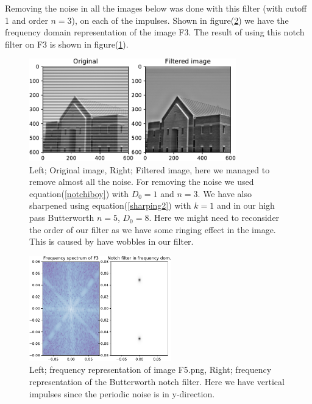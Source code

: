 {Removing the noise in all the images below was done with this filter (with cutoff 1 and order $n = 3$), on each of the impulses. Shown in figure(\ref{C7F3freq}) we have the frequency domain representation of the image F3. The result of using this notch filter on F3 is shown in figure(\ref{C7F3}).

\begin{figure}[!htb]
    {\centering
        \includegraphics[width=0.80\textwidth]{C7F3.pdf}
        \caption{Left; Original image, Right; Filtered image, here we managed to remove almost all the noise. For removing the noise we used equation(\ref{notchiboy}) with $D_{0} = 1$ and $n = 3$.  We have also sharpened using equation(\ref{sharping2}) with $k = 1$ and in our high pass Butterworth $n = 5$, $D_{0} = 8$. Here we might need to reconsider the order of our filter as we have some ringing effect in the image. This is caused by have wobbles in our filter.}
        \label{C7F3}
    \par}
    \end{figure}



    \begin{figure}[!htb]
        {\centering
            \includegraphics[width=0.55\textwidth]{C7F3freq.pdf}
            \caption{Left; frequency representation of image F5.png, Right; frequency representation of the Butterworth notch filter. Here we have vertical impulses since the periodic noise is in y-direction.}
            \label{C7F3freq}
        \par}
        \end{figure}

}
